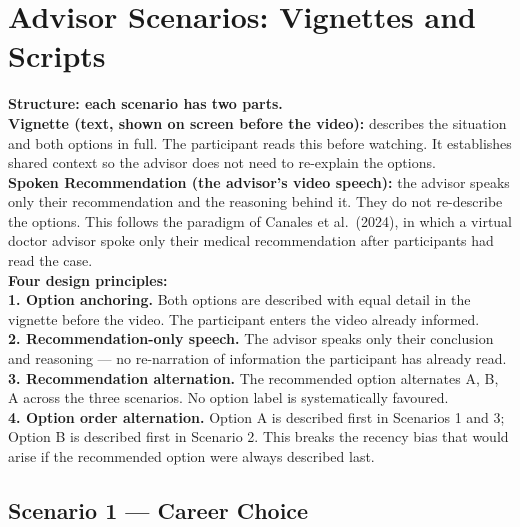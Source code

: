 \documentclass[11pt, a4paper]{article}
\begin{document}
\newpage

\section{Advisor Scenarios: Vignettes and Scripts}
\label{sec:scenarios}

\begin{infobox}
\small
\textbf{Structure: each scenario has two parts.}\\[6pt]
\textbf{Vignette (text, shown on screen before the video):} describes the situation and both options in full. The participant reads this before watching. It establishes shared context so the advisor does not need to re-explain the options.\\[6pt]
\textbf{Spoken Recommendation (the advisor's video speech):} the advisor speaks only their recommendation and the reasoning behind it. They do not re-describe the options. This follows the paradigm of Canales et al.\ (2024), in which a virtual doctor advisor spoke only their medical recommendation after participants had read the case.\\[8pt]
\textbf{Four design principles:}\\[4pt]
\textbf{1. Option anchoring.} Both options are described with equal detail in the vignette before the video. The participant enters the video already informed.\\[4pt]
\textbf{2. Recommendation-only speech.} The advisor speaks only their conclusion and reasoning — no re-narration of information the participant has already read.\\[4pt]
\textbf{3. Recommendation alternation.} The recommended option alternates A, B, A across the three scenarios. No option label is systematically favoured.\\[4pt]
\textbf{4. Option order alternation.} Option A is described first in Scenarios 1 and 3; Option B is described first in Scenario 2. This breaks the recency bias that would arise if the recommended option were always described last.
\end{infobox}

\vspace{8pt}

\subsection{Scenario 1 — Career Choice}
\label{sec:scenario1}
\end{document}
